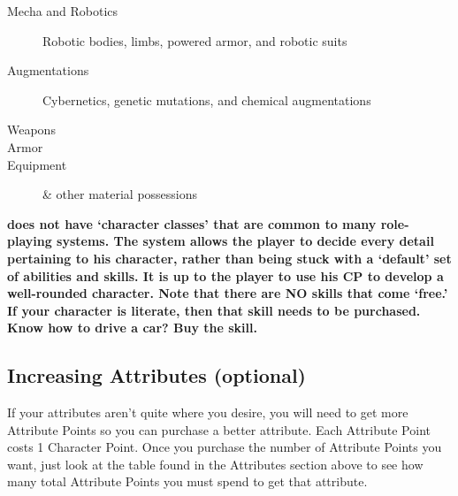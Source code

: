 \documentclass[twoside]{book}
\begin{document}
\begin{itemize}
{\begin{description}
    
  \item[ Mecha and Robotics ] 
    {  
    Robotic bodies, limbs, powered armor, and
                       robotic suits 
    }
  
  \item[ Augmentations ] 
    {  
    Cybernetics, genetic mutations, and chemical
                       augmentations 
    }
  
  \item[ Weapons ] 
    {  
    
    }
  
  \item[ Armor ] 
    {  
    
    }
  
  \item[ Equipment ] 
    {  
     \& other material possessions 
    }
  
\end{description}
  
                
    }
    
              
\end{itemize}
  

 \textbf{\APATHY{}  does not have `character
              classes' that are common to many role-playing
              systems. The \APATHY{}  system allows the player to decide
              every detail pertaining to his character, rather than being
              stuck with a `default' set of abilities and
              skills. It is up to the player to use his CP to develop a
              well-rounded character. Note that there are NO skills that
              come `free.' If your character is literate,
              then that skill needs to be purchased. Know how to drive a
              car? Buy the skill.
            }


    

\subsection{Increasing Attributes (optional)}
    
    {  
    If your attributes aren't quite where you
               desire, you will need to get more Attribute Points so you
               can purchase a better attribute. Each Attribute Point
               costs 1 Character Point. Once you purchase the number of
               Attribute Points you want, just look at the table found in
               the Attributes section above to see how many total
               Attribute Points you must spend to get that attribute.
               
    }
  
\end{document}
